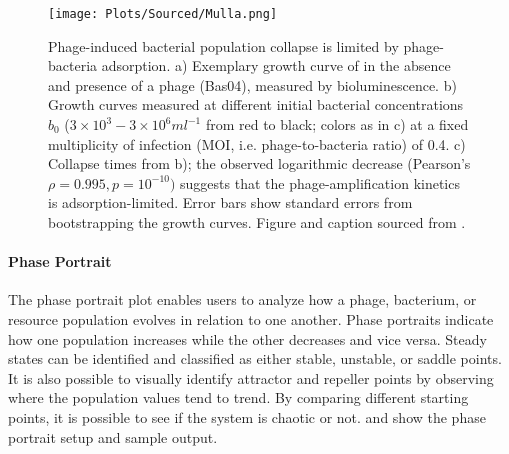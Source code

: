 \begin{figure}[]
    \texttt{[image: Plots/Sourced/Mulla.png]}
    \centering
    \caption{
        Phage-induced bacterial population collapse is limited by phage-bacteria adsorption. 
        a) Exemplary growth curve of  in the absence and presence of a phage (Bas04), measured by bioluminescence. 
        b) Growth curves measured at different initial bacterial concentrations $b_0$ ($3\times10^3 - 3\times 10^6 ml^{-1}$ from red to black; colors as in c) at a fixed multiplicity of infection (MOI, i.e. phage-to-bacteria ratio) of 0.4. 
        c) Collapse times from b); the observed logarithmic decrease (Pearson's $\rho=0.995, p=10^{-10})$ suggests that the phage-amplification kinetics is adsorption-limited. 
        Error bars show standard errors from bootstrapping the growth curves.
        Figure and caption sourced from \citet{mullaExtremeDiversityPhage2024}. 
    }
    \label{fig:sourced:Mulla}
\end{figure}

\paragraph{Phase Portrait}
\label{sec:phase_portrait}
The phase portrait plot enables users to analyze how a phage, bacterium, or resource population evolves in relation to one another.
Phase portraits indicate how one population increases while the other decreases and vice versa.
Steady states can be identified and classified as either stable, unstable, or saddle points. 
It is also possible to visually identify attractor and repeller points by observing where the population values tend to trend. 
By comparing different starting points, it is possible to see if the system is chaotic or not.
 and  show the phase portrait setup and sample output. 

